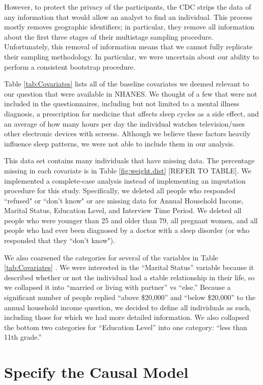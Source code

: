 \documentclass{article}
\begin{document}
However, to protect the privacy of the participants, the CDC strips the data of any information that would allow an analyst to find an individual.  This process mostly removes geographic identifiers; in particular, they remove all information about the first three stages of their multistage sampling procedure.  Unfortunately, this removal of information means that we cannot fully replicate their sampling methodology. In particular, we were uncertain about our ability to perform a consistent bootstrap procedure.

Table \ref{tab:Covariates}  lists all of the baseline covariates we deemed relevant to our question that were available in NHANES.  We thought of a few that were not included in the questionnaires, including but not limited to a mental illness diagnosis, a prescription for medicine that affects sleep cycles as a side effect, and an average of how many hours per day the individual watches television/uses other electronic devices with screens.  Although we believe these factors heavily influence sleep patterns, we were not able to include them in our analysis.

This data set contains many individuals that have missing data.  The percentage missing in each covariate is in Table \ref{fig:weight.dist}  [REFER TO TABLE].  We implemented a complete-case analysis instead of implementing an imputation procedure for this study. Specifically, we deleted all people who responded ``refused" or ``don't know" or are missing data for Annual Household Income, Marital Status, Education Level, and Interview Time Period.  We deleted all people who were younger than 25 and older than 79, all pregnant women, and all people who had ever been diagnosed by a doctor with a sleep disorder (or who responded that they ``don't know").  

We also coarsened the categories for several of the variables in Table \ref{tab:Covariates} .  We were interested in the ``Marital Status'' variable because it described whether or not the individual had a stable relationship in their life, so we collapsed it into ``married or living with partner'' vs ``else.''  Because a significant number of people replied ``above \$20,000'' and ``below \$20,000'' to the annual household income question, we decided to define all individuals as such, including those for which we had more detailed information.  We also collapsed the bottom two categories for ``Education Level'' into one category: ``less than 11th grade.''

\section{Specify the Causal Model}
\end{document}
